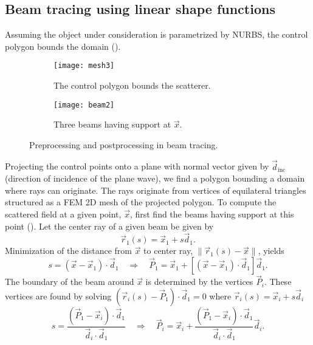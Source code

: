 \subsection{Beam tracing using linear shape functions}
Assuming the object under consideration is parametrized by NURBS, the control polygon bounds the domain ().
\begin{figure}
	\centering
	\begin{subfigure}[t]{0.49\textwidth}
		\centering
		\texttt{[image: mesh3]}
		\caption{The control polygon bounds the scatterer.}
		\label{Fig:boundingBox}
	\end{subfigure}%
	\hspace*{0.02\textwidth}%
	\begin{subfigure}[t]{0.49\textwidth}
		\centering
		\texttt{[image: beam2]}
		\caption{Three beams having support at $\vec{x}$.}
		\label{Fig:supportBeam}
	\end{subfigure}
	\caption{Preprocessing and postprocessing in beam tracing.}
\end{figure}
Projecting the control points onto a plane with normal vector given by $\vec{d}_{\mathrm{inc}}$ (direction of incidence of the plane wave), we find a polygon bounding a domain where rays can originate. The rays originate from vertices of equilateral triangles structured as a FEM 2D mesh of the projected polygon. To compute the scattered field at a given point, $\vec{x}$, first find the beams having support at this point (). Let the center ray of a given beam be given by
\begin{equation*}
	\vec{r}_1(s) = \vec{x}_1 + s\vec{d}_1.
\end{equation*}
Minimization of the distance from $\vec{x}$ to center ray, $\|\vec{r}_1(s)-\vec{x}\|$, yields
\begin{equation*}
	s = (\vec{x}-\vec{x}_1)\cdot \vec{d}_1\quad\Rightarrow\quad \vec{P}_1 = \vec{x}_1 + [(\vec{x}-\vec{x}_1)\cdot \vec{d}_1]\vec{d}_1.
\end{equation*}
The boundary of the beam around $\vec{x}$ is determined by the vertices $\vec{P}_i$. These vertices are found by solving $(\vec{r}_i(s)-\vec{P}_1)\cdot \vec{d}_1 = 0$ where $\vec{r}_i(s) = \vec{x}_i + s\vec{d}_i$
\begin{equation*}
	s = \frac{(\vec{P}_1-\vec{x}_i)\cdot\vec{d}_1}{\vec{d}_i\cdot\vec{d}_1}\quad\Rightarrow\quad \vec{P}_i = \vec{x}_i + \frac{(\vec{P}_1-\vec{x}_i)\cdot\vec{d}_1}{\vec{d}_i\cdot\vec{d}_1}\vec{d}_i.
\end{equation*}
